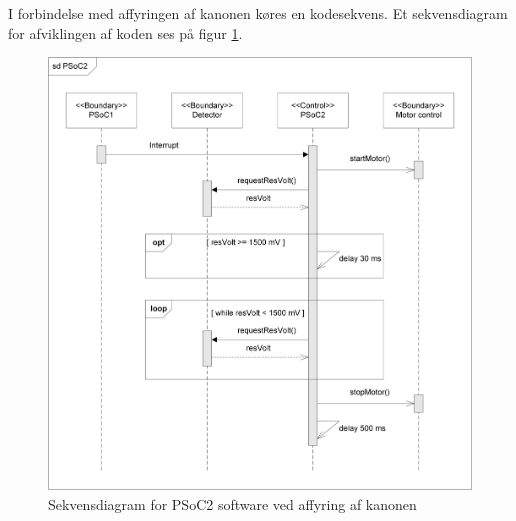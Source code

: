 I forbindelse med affyringen af kanonen køres en kodesekvens. Et sekvensdiagram for afviklingen af koden ses på figur \ref{fig:aktivitetsdiagramDetektor}. 

\begin{figure}[H]
	\centering
	\includegraphics[width=1\textwidth]{Afsnit/DesignOgImplementering/images/PSoC2sekvens.png}
	\caption{Sekvensdiagram for PSoC2 software ved affyring af kanonen} 
	\label{fig:aktivitetsdiagramDetektor}
\end{figure}


